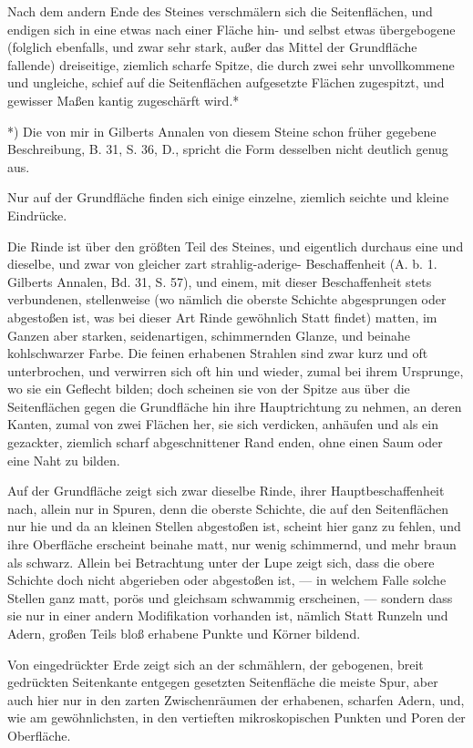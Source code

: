 \documentclass[a4paper, 11pt, oneside, german]{article}
\begin{document}
Nach dem andern Ende des Steines verschmälern sich die Seitenflächen, und endigen sich in eine etwas nach einer Fläche hin- und selbst etwas übergebogene (folglich ebenfalls, und zwar sehr stark, außer das Mittel der Grundfläche fallende) dreiseitige, ziemlich scharfe Spitze, die durch zwei sehr unvollkommene und ungleiche, schief auf die Seitenflächen aufgesetzte Flächen zugespitzt, und gewisser Maßen kantig zugeschärft wird.*

*) Die von mir in Gilberts Annalen von diesem Steine schon früher gegebene Beschreibung, B. 31, S. 36, D., spricht die Form desselben nicht deutlich genug aus.

Nur auf der Grundfläche finden sich einige einzelne, ziemlich seichte und kleine Eindrücke.

Die Rinde ist über den größten Teil des Steines, und eigentlich durchaus eine und dieselbe, und zwar von gleicher zart strahlig-aderige- Beschaffenheit (A. b. 1. Gilberts Annalen, Bd. 31, S. 57), und einem, mit dieser Beschaffenheit stets verbundenen, stellenweise (wo nämlich die oberste Schichte abgesprungen oder abgestoßen ist, was bei dieser Art Rinde gewöhnlich Statt findet) matten, im Ganzen aber starken, seidenartigen, schimmernden Glanze, und beinahe kohlschwarzer Farbe. Die feinen erhabenen Strahlen sind zwar kurz und oft unterbrochen, und verwirren sich oft hin und wieder, zumal bei ihrem Ursprunge, wo sie ein Geflecht bilden; doch scheinen sie von der Spitze aus über die Seitenflächen gegen die Grundfläche hin ihre Hauptrichtung zu nehmen, an deren Kanten, zumal von zwei Flächen her, sie sich verdicken, anhäufen und als ein gezackter, ziemlich scharf abgeschnittener Rand enden, ohne einen Saum oder eine Naht zu bilden.

Auf der Grundfläche zeigt sich zwar dieselbe Rinde, ihrer Hauptbeschaffenheit nach, allein nur in Spuren, denn die oberste Schichte, die auf den Seitenflächen nur hie und da an kleinen Stellen abgestoßen ist, scheint hier ganz zu fehlen, und ihre Oberfläche erscheint beinahe matt, nur wenig schimmernd, und mehr braun als schwarz. Allein bei Betrachtung unter der Lupe zeigt sich, dass die obere Schichte doch nicht abgerieben oder abgestoßen ist, --- in welchem Falle solche Stellen ganz matt, porös und gleichsam schwammig erscheinen, --- sondern dass sie nur in einer andern Modifikation vorhanden ist, nämlich Statt Runzeln und Adern, großen Teils bloß erhabene Punkte und Körner bildend.

Von eingedrückter Erde zeigt sich an der schmählern, der gebogenen, breit gedrückten Seitenkante entgegen gesetzten Seitenfläche die meiste Spur, aber auch hier nur in den zarten Zwischenräumen der erhabenen, scharfen Adern, und, wie am gewöhnlichsten, in den vertieften mikroskopischen Punkten und Poren der Oberfläche.
\end{document}
